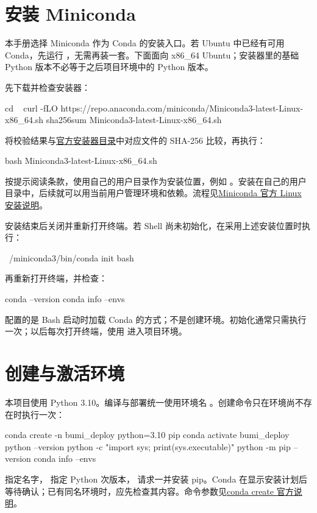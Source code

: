 \section{安装 Miniconda}
本手册选择 Miniconda 作为 Conda 的安装入口。若 Ubuntu 中已经有可用 Conda，先运行 ，无需再装一套。下面面向 x86\_64 Ubuntu；安装器里的基础 Python 版本不必等于之后项目环境中的 Python 版本。

先下载并检查安装器：
\begin{command}
cd ~
curl -fLO https://repo.anaconda.com/miniconda/Miniconda3-latest-Linux-x86_64.sh
sha256sum Miniconda3-latest-Linux-x86_64.sh
\end{command}
将校验结果与\href{https://repo.anaconda.com/miniconda/}{官方安装器目录}中对应文件的 SHA-256 比较，再执行：
\begin{command}
bash Miniconda3-latest-Linux-x86_64.sh
\end{command}
按提示阅读条款，使用自己的用户目录作为安装位置，例如 。安装在自己的用户目录中，后续就可以用当前用户管理环境和依赖。流程见\href{https://www.anaconda.com/docs/getting-started/miniconda/install/linux-install}{Miniconda 官方 Linux 安装说明}。

安装结束后关闭并重新打开终端。若 Shell 尚未初始化，在采用上述安装位置时执行：
\begin{command}
~/miniconda3/bin/conda init bash
\end{command}
再重新打开终端，并检查：
\begin{command}
conda --version
conda info --envs
\end{command}
 配置的是 Bash 启动时加载 Conda 的方式；不是创建环境。初始化通常只需执行一次；以后每次打开终端，使用  进入项目环境。

\section{创建与激活环境}
本项目使用 Python 3.10。编译与部署统一使用环境名 。创建命令只在环境尚不存在时执行一次：
\begin{command}
conda create -n bumi_deploy python=3.10 pip
conda activate bumi_deploy
python --version
python -c "import sys; print(sys.executable)"
python -m pip --version
conda info --envs
\end{command}
 指定名字， 指定 Python 次版本， 请求一并安装 pip。Conda 在显示安装计划后等待确认；已有同名环境时，应先检查其内容。命令参数见\href{https://docs.conda.io/projects/conda/en/stable/commands/create.html}{conda create 官方说明}。

